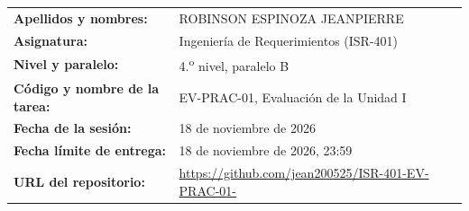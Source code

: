\documentclass[11pt,a4paper]{article}
\begin{document}
\noindent\begin{tabular}{@{}ll@{}}
\textbf{Apellidos y nombres:} & ROBINSON ESPINOZA JEANPIERRE\\
\textbf{Asignatura:} & Ingeniería de Requerimientos (ISR-401)\\
\textbf{Nivel y paralelo:} & 4.\textsuperscript{o} nivel, paralelo B\\
\textbf{Código y nombre de la tarea:} & EV-PRAC-01, Evaluación de la Unidad I\\
\textbf{Fecha de la sesión:} & 18 de noviembre de 2026\\
\textbf{Fecha límite de entrega:} & 18 de noviembre de 2026, 23:59\\
\textbf{URL del repositorio:} & \mbox{\url{https://github.com/jean200525/ISR-401-EV-PRAC-01-}}\\
\end{tabular}
\end{document}
